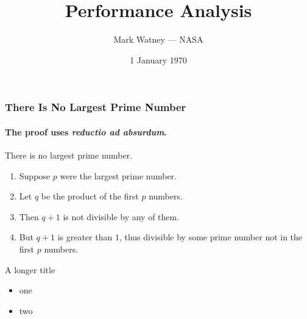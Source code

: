 \documentclass[aspectratio=169]{beamer}
\title[\thereportnumber~---~\thecodename]{\thecodename Performance Analysis}
\date[1970/01/01]{1 January 1970}
\author[Watney (NASA)]{Mark Watney --- NASA}
\begin{document}
\begin{frame}
\titlepage
\end{frame}


\begin{frame} 
\frametitle{There Is No Largest Prime Number} 
\framesubtitle{The proof uses \textit{reductio ad absurdum}.} 
\begin{theorem}
There is no largest prime number. \end{theorem} 
\begin{enumerate} 
\item<1-| alert@1> Suppose $p$ were the largest prime number. 
\item<2-> Let $q$ be the product of the first $p$ numbers. 
\item<3-> Then $q+1$ is not divisible by any of them. 
\item<1-> But $q + 1$ is greater than $1$, thus divisible by some prime
number not in the first $p$ numbers.
\end{enumerate}
\end{frame}

\begin{frame}{A longer title}
\begin{itemize}
\item one
\item two
\end{itemize}
\end{frame}
\end{document}

